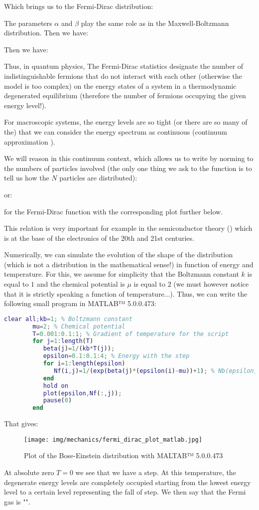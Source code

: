 	Which brings us to the Fermi-Dirac distribution:
	
	The parameters $\alpha$ and $\beta$ play the same role as in the Maxwell-Boltzmann distribution. Then we have:
	
	Then we have:
	
	Thus, in quantum physics, The Fermi-Dirac statistics designate the number of indistinguishable fermions that do not interact with each other (otherwise the model is too complex) on the energy states of a system in a thermodynamic degenerated equilibrium (therefore the number of fermions occupying the given energy level!).

	For macroscopic systems, the energy levels are so tight (or there are so many of the) that we can consider the energy spectrum as continuous (continuum approximation  ).

	We will reason in this continuum context, which allows us to write by norming to the numbers of particles involved (the only one thing we ask to the function is to tell us how the $N$ particles are distributed):
	
	or:
	
	for the Fermi-Dirac function with the corresponding plot further below.

	This relation is very important for example in the semiconductor theory () which is at the base of the electronics of the 20th and 21st centuries.

	Numerically, we can simulate the evolution of the shape of the distribution (which is not a distribution in the mathematical sense!) in function of energy and temperature. For this, we assume for simplicity that the Boltzmann constant $k$ is equal to $1$ and the chemical potential is $\mu$ is equal to $2$ (we must however notice that it is strictly speaking a function of temperature...). Thus, we can write the following small program in MATLAB™ 5.0.0.473:
	\begin{lstlisting}[language=MATLAB]
		clear all;kb=1; % Boltzmann constant
		mu=2; % Chemical potential
		T=0.001:0.1:1; % Gradient of temperature for the script
		for j=1:length(T)
		   beta(j)=1/(kb*T(j));
		   epsilon=0.1:0.1:4; % Energy with the step
		   for i=1:length(epsilon)
		      Nf(i,j)=1/(exp(beta(j)*(epsilon(i)-mu))+1); % Nb(epsilon,beta) average of fermions at the level of enery epsilon
		   end
		   hold on
		   plot(epsilon,Nf(:,j));
		   pause(0)
		end
	\end{lstlisting}
	That gives:
	\begin{figure}[H]
		\centering
		\texttt{[image: img/mechanics/fermi\_dirac\_plot\_matlab.jpg]}
		\caption{Plot of the Bose-Einstein distribution with MALTAB™ 5.0.0.473}
	\end{figure}
	At absolute zero $T=0$ we see that we have a step. At this temperature, the degenerate energy levels are completely occupied starting from the lowest energy level to a certain level representing the fall of step. We then say that the Fermi gas is "".

